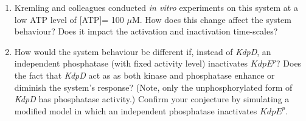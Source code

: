 \documentclass[12pt]{article}
\begin{document}
\begin{enumerate}
\begin{enumerate}
\item Kremling and colleagues conducted {\em in vitro} experiments on this system at a low ATP level of [ATP]= 100 $\mu$M.  How does this change affect the system behaviour?  Does it impact the activation and inactivation time-scales?

\item How would the system behaviour be different if, instead of {\em KdpD}, an independent phosphatase (with fixed activity level) inactivates $KdpE^p$?    Does the fact that {\em KdpD} act as as both kinase and phosphatase enhance or diminish the system's response?  (Note, only the unphosphorylated form of {\em KdpD} has phosphatase activity.) Confirm your conjecture by simulating a modified model in which an independent phosphatase inactivates $KdpE^p$.  



\end{enumerate}



\end{enumerate}
\end{document}
